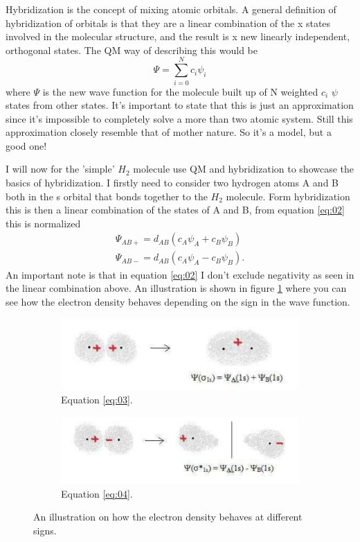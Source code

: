 \documentclass[jmp, amsmath, amssymb, reprint]{article}
\numberwithin{equation}{section}
\newcommand{\lp}{\left(}
\newcommand{\rp}{\right)}
\begin{document}
\begin{multicols}{2}
Hybridization is the concept of mixing atomic orbitals. A general definition of hybridization of orbitals is that they are a linear combination of the x states involved in the molecular structure, and the result is x new linearly independent, orthogonal states. The QM way of describing this would be
\begin{equation}\label{eq:02}
\Psi = \sum_{i=0}^N c_i\psi_i
\end{equation}
where \(\Psi\) is the new wave function for the molecule built up of N weighted \(c_i\) \(\psi\) states from other states. It's important to state that this is just an approximation since it's impossible to completely solve a more than two atomic system. Still this approximation closely resemble that of mother nature. So it's a model, but a good one!

I will now for the 'simple' \(H_2\) molecule use QM and hybridization to showcase the basics of hybridization. I firstly need to consider two hydrogen atoms A and B both in the s orbital that bonds together to the \(H_2\) molecule. Form hybridization this is then a linear combination of the states of A and B, from equation \ref{eq:02} this is normalized
\begin{align}
\Psi_{AB+} = d_{AB}\lp c_A\psi_A + c_B\psi_B\rp\label{eq:03}\\
\Psi_{AB-} = d_{AB}\lp c_A\psi_A - c_B\psi_B\rp.\label{eq:04}
\end{align}
An important note is that in equation \ref{eq:02} I don't exclude negativity as seen in the linear combination above. An illustration is shown in figure \ref{fig:wave_sum} where you can see how the electron density behaves depending on the sign in the wave function. 

\begin{figure}[H]
	\centering
	\begin{subfigure}{0.49\textwidth}
  	\includegraphics[width=1\textwidth]{h2_pos.png}
	\caption{Equation \ref{eq:03}.}
	\end{subfigure}
	\begin{subfigure}{0.49\textwidth}
  	\includegraphics[width=1\textwidth]{h2_neg.png}
	\caption{Equation \ref{eq:04}.}
	\end{subfigure}
	\caption{An illustration on how the electron density behaves at different signs.}
	\label{fig:wave_sum}
\end{figure}


\end{multicols}
\end{document}
